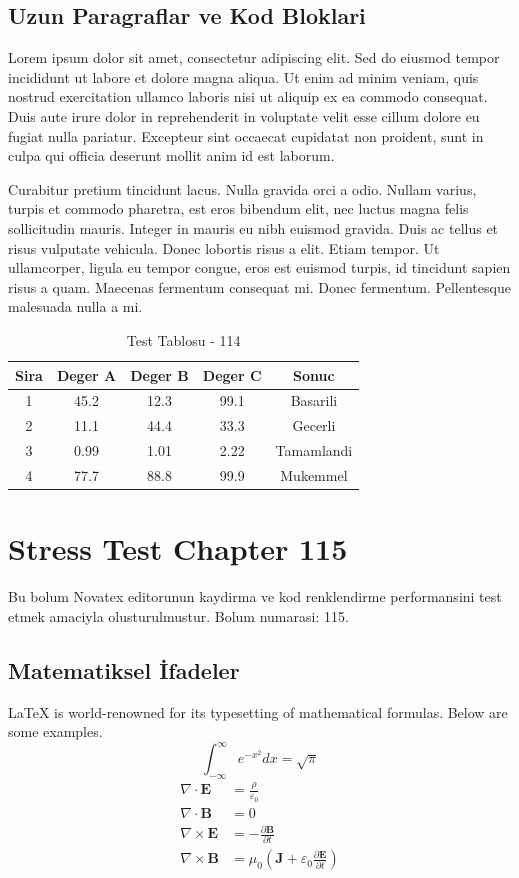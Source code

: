 \documentclass[12pt,a4paper]{article}
\begin{document}
\subsection{Uzun Paragraflar ve Kod Bloklari}
Lorem ipsum dolor sit amet, consectetur adipiscing elit. Sed do eiusmod tempor incididunt ut labore et dolore magna aliqua. Ut enim ad minim veniam, quis nostrud exercitation ullamco laboris nisi ut aliquip ex ea commodo consequat. Duis aute irure dolor in reprehenderit in voluptate velit esse cillum dolore eu fugiat nulla pariatur. Excepteur sint occaecat cupidatat non proident, sunt in culpa qui officia deserunt mollit anim id est laborum.

Curabitur pretium tincidunt lacus. Nulla gravida orci a odio. Nullam varius, turpis et commodo pharetra, est eros bibendum elit, nec luctus magna felis sollicitudin mauris. Integer in mauris eu nibh euismod gravida. Duis ac tellus et risus vulputate vehicula. Donec lobortis risus a elit. Etiam tempor. Ut ullamcorper, ligula eu tempor congue, eros est euismod turpis, id tincidunt sapien risus a quam. Maecenas fermentum consequat mi. Donec fermentum. Pellentesque malesuada nulla a mi.

\begin{table}[h!]
\centering
\begin{tabular}{|c|c|c|c|c|}
\hline
\textbf{Sira} & \textbf{Deger A} & \textbf{Deger B} & \textbf{Deger C} & \textbf{Sonuc} \\
\hline
1 & 45.2 & 12.3 & 99.1 & Basarili \\
2 & 11.1 & 44.4 & 33.3 & Gecerli \\
3 & 0.99 & 1.01 & 2.22 & Tamamlandi \\
4 & 77.7 & 88.8 & 99.9 & Mukemmel \\
\hline
\end{tabular}
\caption{Test Tablosu - 114}
\end{table}

\newpage
\section{Stress Test Chapter 115}
Bu bolum Novatex editorunun kaydirma ve kod renklendirme performansini test etmek amaciyla olusturulmustur. Bolum numarasi: 115.

\subsection{Matematiksel İfadeler}
\LaTeX{} is world-renowned for its typesetting of mathematical formulas. Below are some examples.
\begin{equation}
\int_{-\infty}^{\infty} e^{-x^2} dx = \sqrt{\pi}
\end{equation}
\begin{align}
\nabla \cdot \mathbf{E} &= \frac{\rho}{\varepsilon_0} \\
\nabla \cdot \mathbf{B} &= 0 \\
\nabla \times \mathbf{E} &= -\frac{\partial \mathbf{B}}{\partial t} \\
\nabla \times \mathbf{B} &= \mu_0\left(\mathbf{J} + \varepsilon_0 \frac{\partial \mathbf{E}}{\partial t}\right)
\end{align}
\end{document}
